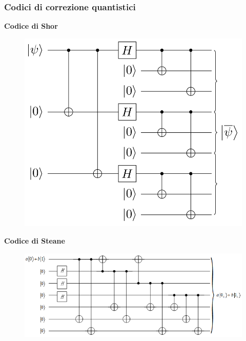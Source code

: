 \documentclass[aspectratio=169]{beamer}
\begin{document}
\begin{frame}
	\frametitle{Codici di correzione quantistici}
	\begin{minipage}{0.35\textwidth}
		\centering
		\textbf{Codice di Shor}
		\begin{figure}
			\includegraphics[scale=0.175]{shor-code-encode.png}
		\end{figure}

	\end{minipage}
	\pause
	\begin{minipage}{0.63\textwidth}
		\centering
		\textbf{Codice di Steane}
		\begin{figure}
			\includegraphics[scale=0.4]{encoding_circuit_for_Steane_code.png}
		\end{figure}

	\end{minipage}


\end{frame}
\end{document}
